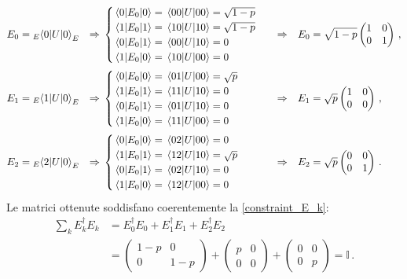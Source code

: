 \begin{align*}
    E_0 &= {}_E \! \mel{0}{U}{0}_E &\Rightarrow& \;
    \begin{cases}
        \mel{0}{E_0}{0}=\mel{00}{U}{00}=\sqrt{1-p} \\
        \mel{1}{E_0}{1}=\mel{10}{U}{10}=\sqrt{1-p} \\
        \mel{0}{E_0}{1}=\mel{00}{U}{10}=0 \\
        \mel{1}{E_0}{0}=\mel{10}{U}{00}=0
    \end{cases} 
    &\Rightarrow&
    &E_0 &= \sqrt{1-p}
          \begin{pmatrix}
            1 & 0 \\
            0 & 1
          \end{pmatrix} \, , \\
    E_1 &= {}_E \! \mel{1}{U}{0}_E &\Rightarrow& \;    \begin{cases}
        \mel{0}{E_0}{0}=\mel{01}{U}{00}=\sqrt{p} \\
        \mel{1}{E_0}{1}=\mel{11}{U}{10}=0 \\
        \mel{0}{E_0}{1}=\mel{01}{U}{10}=0 \\
        \mel{1}{E_0}{0}=\mel{11}{U}{00}=0
    \end{cases}
    &\Rightarrow&
    &E_1 &= \sqrt{p}
          \begin{pmatrix}
            1 & 0 \\
            0 & 0
          \end{pmatrix} \, , \\
    E_2 &= {}_E \! \mel{2}{U}{0}_E &\Rightarrow& \;
    \begin{cases}
        \mel{0}{E_0}{0}=\mel{02}{U}{00}=0 \\
        \mel{1}{E_0}{1}=\mel{12}{U}{10}=\sqrt{p} \\
        \mel{0}{E_0}{1}=\mel{02}{U}{10}=0 \\
        \mel{1}{E_0}{0}=\mel{12}{U}{00}=0
    \end{cases}
    &\Rightarrow&
    &E_2 &= \sqrt{p}
          \begin{pmatrix}
            0 & 0 \\
            0 & 1
          \end{pmatrix} \, .
\end{align*}
Le matrici ottenute soddisfano coerentemente la \eqref{constraint_E_k}:
\begin{align*}
    \sum_k E_k^\dagger E_k &= E_0^\dagger E_0 + E_1^\dagger E_1 +  E_2^\dagger E_2 \\
    &=
    \begin{pmatrix}
        1-p & 0 \\
        0 & 1-p
    \end{pmatrix}
    +
    \begin{pmatrix}
        p & 0 \\
        0 & 0
    \end{pmatrix}
    +
    \begin{pmatrix}
        0 & 0 \\
        0 & p
    \end{pmatrix} = \mathbb{I} \, .
\end{align*}
